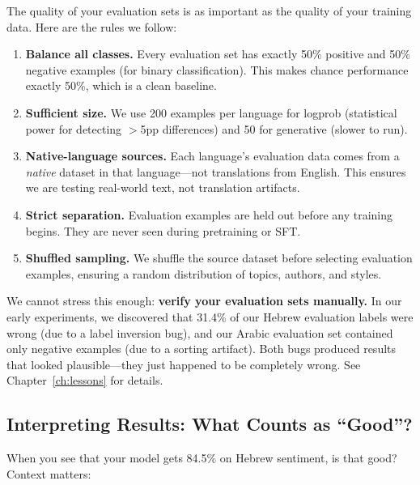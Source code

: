 \documentclass[11pt,a4paper]{article}
\begin{document}
The quality of your evaluation sets is as important as the quality of your training data. Here are the rules we follow:

\begin{enumerate}
    \item \textbf{Balance all classes.} Every evaluation set has exactly 50\% positive and 50\% negative examples (for binary classification). This makes chance performance exactly 50\%, which is a clean baseline.
    
    \item \textbf{Sufficient size.} We use 200 examples per language for logprob (statistical power for detecting $>$5pp differences) and 50 for generative (slower to run).
    
    \item \textbf{Native-language sources.} Each language's evaluation data comes from a \emph{native} dataset in that language---not translations from English. This ensures we are testing real-world text, not translation artifacts.
    
    \item \textbf{Strict separation.} Evaluation examples are held out before any training begins. They are never seen during pretraining or SFT.
    
    \item \textbf{Shuffled sampling.} We shuffle the source dataset before selecting evaluation examples, ensuring a random distribution of topics, authors, and styles.
\end{enumerate}

\begin{warning}
We cannot stress this enough: \textbf{verify your evaluation sets manually.} In our early experiments, we discovered that 31.4\% of our Hebrew evaluation labels were wrong (due to a label inversion bug), and our Arabic evaluation set contained only negative examples (due to a sorting artifact). Both bugs produced results that looked plausible---they just happened to be completely wrong. See Chapter~\ref{ch:lessons} for details.
\end{warning}

\subsection{Interpreting Results: What Counts as ``Good''?}

When you see that your model gets 84.5\% on Hebrew sentiment, is that good? Context matters:
\end{document}
